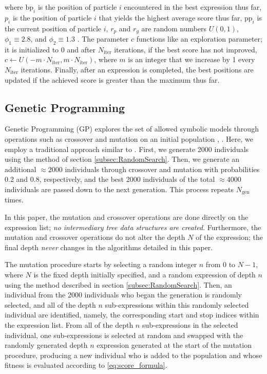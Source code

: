 \documentclass[runningheads]{llncs}
\begin{document}
where $\mathrm{bp}_i$ is the position of particle $i$ encountered in the best expression thus far, $p_i$ is the position of particle $i$ that yields the highest average score thus far, $\mathrm{pp}_i$ is the current position of particle $i$, $r_p$ and $r_g$ are random numbers $U(0,1)$, $\phi_1 \equiv 2.8$, and $\phi_2 \equiv 1.3$  \cite{offShellPSO}. The parameter $c$ functions like an exploration parameter; it is initialized to 0 and after $N_{\mathrm{iter}}$ iterations, if the best score has not improved, $c \gets U(-m\cdot N_{\mathrm{iter}}, m\cdot N_{\mathrm{iter}})$, where $m$ is an integer that we increase by 1 every $N_{\mathrm{iter}}$ iterations. Finally, after an expression is completed, the best positions are updated if the achieved score is greater than the maximum thus far.

\subsection{Genetic Programming} \label{subsec:GeneticProgramming}
Genetic Programming (GP) explores the set of allowed symbolic models through operations such as crossover and mutation on an initial population \cite{manti2023discovering} \cite{PoliFieldGuideGP}, \cite{Koza1994}. Here, we employ a traditional approach similar to \cite{manti2023discovering}. First, we generate 2000 individuals using the method of section \ref{subsec:RandomSearch}. Then, we generate an additional $\approx 2000$ individuals through crossover and mutation with probabilities 0.2 and 0.8, respectively, and the best 2000 individuals of the total $\approx 4000$ individuals are passed down to the next generation. This process repeats $N_{\mathrm{gen}}$ times.
\par In this paper, the mutation and crossover operations are done directly on the expression list; \emph{no intermediary tree data structures are created}. Furthermore, the mutation and crossover operations do not alter the depth $N$ of the expression; the final depth \emph{never} changes in the algorithms detailed in this paper. 
\par The mutation procedure starts by selecting a random integer $n$ from $0$ to $N-1$, where $N$ is the fixed depth initially specified, and a random expression of depth $n$ using the method described in section \ref{subsec:RandomSearch}. Then, an individual from the 2000 individuals who began the generation is randomly selected, and all of the depth $n$ sub-expressions within this randomly selected individual are identified, namely, the corresponding start and stop indices within the expression list. From all of the depth $n$ sub-expressions in the selected individual, one sub-expressions is selected at random and swapped with the randomly generated depth $n$ expression generated at the start of the mutation procedure, producing a new individual who is added to the population and whose fitness is evaluated according to \ref{eq:score_formula}.
\end{document}
